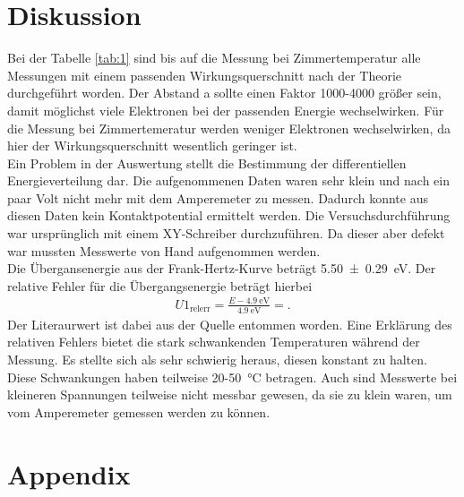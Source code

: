 \section{Diskussion}
Bei der Tabelle \ref{tab:1} sind bis auf die Messung bei Zimmertemperatur alle
Messungen mit einem passenden Wirkungsquerschnitt nach der Theorie durchgeführt worden.
Der Abstand a sollte einen Faktor 1000-4000 größer sein, damit möglichst viele Elektronen
bei der passenden Energie wechselwirken. Für die Messung bei Zimmertemeratur werden
weniger Elektronen wechselwirken, da hier der Wirkungsquerschnitt wesentlich geringer ist.\\
Ein Problem in der Auswertung stellt die Bestimmung der differentiellen Energieverteilung dar.
Die aufgenommenen Daten waren sehr klein und nach ein paar Volt nicht mehr mit dem 
Amperemeter zu messen. Dadurch konnte aus diesen Daten kein Kontaktpotential ermittelt werden.
Die Versuchsdurchführung war ursprünglich mit einem XY-Schreiber durchzuführen.
Da dieser aber defekt war mussten Messwerte von Hand aufgenommen werden. \\
Die Übergansenergie aus der Frank-Hertz-Kurve beträgt \SI{5.50+-0.29}{\electronvolt}.
Der relative Fehler für die Übergangsenergie beträgt hierbei
\begin{align}
    U1_{\text{relerr}} = \frac{E-\SI{4.9}{\electronvolt}}{\SI{4.9}{\electronvolt}} =\text{}. \label{eq:10} 
\end{align}
Der Literaurwert ist dabei aus der Quelle \cite{linsen200926} entommen worden.
Eine Erklärung des relativen Fehlers bietet die stark schwankenden Temperaturen
während der Messung. Es stellte sich als sehr schwierig heraus, diesen konstant zu halten.
Diese Schwankungen haben teilweise 20-\SI{50}{\celsius} betragen. Auch sind Messwerte bei kleineren
Spannungen teilweise nicht messbar gewesen, da sie zu klein waren, um vom Amperemeter 
gemessen werden zu können.



\newpage
\printbibliography
\newpage
\section*{Appendix}



